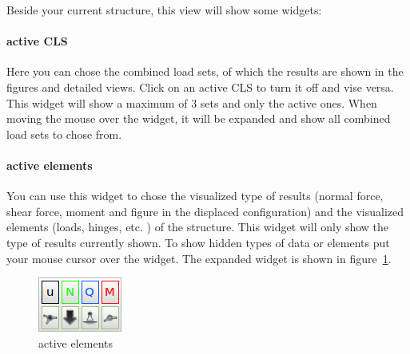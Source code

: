 \documentclass[a4paper,11pt]{report}
\begin{document}
Beside your current structure, this view will show some widgets:

\paragraph{active CLS} Here you can chose the combined load sets, of which the results are shown in the figures and detailed views. Click on an active CLS to turn it off and vise versa. This widget will show a maximum of 3 sets and only the active ones. When moving the mouse over the widget, it will be expanded and show all combined load sets to chose from.

\paragraph{active elements} You can use this widget to chose the visualized type of results (normal force, shear force, moment and figure in the displaced configuration) and the visualized elements (loads, hinges, etc. ) of the structure. This widget will only show the type of results currently shown. To show hidden types of data or elements put your mouse cursor over the widget. The expanded widget is shown in figure~\ref{pic:activeelements}.

\begin{figure}[H]
\begin{center}
\includegraphics[]{../pictures/activeelements.png}
\caption{active elements}
\label{pic:activeelements}
\end{center}
\end{figure}
\end{document}
